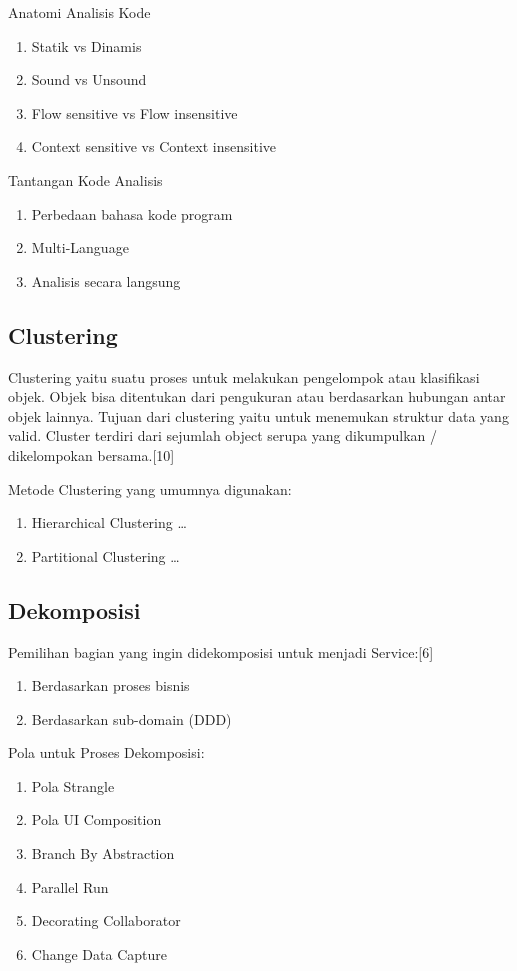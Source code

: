 Anatomi Analisis Kode
\begin{enumerate}[leftmargin=1.3cm]
	\item Statik vs Dinamis
	\item Sound vs Unsound
	\item Flow sensitive vs Flow insensitive
	\item Context sensitive vs Context insensitive
\end{enumerate}

Tantangan Kode Analisis
\begin{enumerate}[leftmargin=1.3cm]
	\item Perbedaan bahasa kode program
	\item Multi-Language
	\item Analisis secara langsung
\end{enumerate}

\subsection{Clustering}
Clustering yaitu suatu proses untuk melakukan pengelompok atau klasifikasi objek. Objek bisa ditentukan dari pengukuran atau berdasarkan hubungan antar objek lainnya. Tujuan dari clustering yaitu untuk  menemukan struktur data yang valid. Cluster terdiri dari sejumlah object serupa yang dikumpulkan / dikelompokan bersama.[10]

Metode Clustering yang umumnya digunakan:
\begin{enumerate}[leftmargin=1.3cm]
	\item Hierarchical Clustering
	…
	\item Partitional Clustering
	…
	
\end{enumerate}	
\subsection{Dekomposisi}
Pemilihan bagian yang ingin didekomposisi untuk menjadi Service:[6]
\begin{enumerate}[leftmargin=1.3cm]
\item Berdasarkan proses bisnis
\item Berdasarkan sub-domain (DDD)
\end{enumerate}	

Pola untuk Proses Dekomposisi:
\begin{enumerate}[leftmargin=1.3cm]
	\item Pola Strangle 
	\item Pola UI Composition
	\item Branch By Abstraction
	\item Parallel Run
	\item Decorating Collaborator
	\item Change Data Capture
\end{enumerate}	

